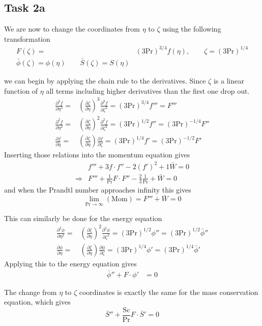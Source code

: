 \subsection*{Task 2a}
We are now to change the coordinates from $\eta$ to $\zeta$ using the following transformation
\begin{align*}
  F(\zeta) =& (3\text{Pr})^{3/4} f(\eta), \qquad \zeta = (3 \text{Pr})^{1/4} \\
  \bar{\phi}(\zeta) = \phi (\eta) \qquad \bar{S}(\zeta) = S(\eta )
\end{align*}

we can begin by applying the chain rule to the derivatives. Since $\zeta$ is a linear function of $\eta$ all terms including higher derivatives than the first one drop out.
\begin{align*}
  \frac{\partial^3 f}{\partial \eta^3}=& \left( \frac{\partial \zeta}{\partial \eta} \right)^3 \frac{\partial^3 f}{\partial \zeta^3}=(3 \text{Pr})^{3/4}f'''=F'''\\
  \frac{\partial^2 f}{\partial \eta^2}=& \left( \frac{\partial \zeta}{\partial \eta} \right)^2 \frac{\partial^2 f}{\partial \zeta^2}=(3 \text{Pr})^{1/2}f''=(3 \text{Pr})^{-1/4} F''\\
  \frac{\partial f}{\partial \eta}=& \left( \frac{\partial \zeta}{\partial \eta} \right) \frac{\partial f}{\partial \zeta}=(3 \text{Pr})^{1/4}f'=(3 \text{Pr})^{-1/2}F'
\end{align*}
Inserting those relations into the momentum equation gives
\begin{align*}
  &f'''+3f\cdot f'' -2(f')^2 + 1 \bar{W} = 0 \\
  \Rightarrow& F''' +\frac{1}{\text{Pr}}F\cdot F'' -\frac{2}{3}\frac{1}{\text{Pr}}+\bar{W}=0 
\end{align*}
and when the Prandtl number approaches infinity this gives
\begin{equation*}
  \lim_{\text{Pr}\rightarrow \infty} (\text{Mom}) = F'''+\bar{W} =0
\end{equation*}

This can similarly be done for the energy equation
\begin{align*}
  \frac{\partial^2 \phi}{\partial \eta^2}=& \left( \frac{\partial \zeta}{\partial \eta} \right)^2 \frac{\partial^2 \phi}{\partial \zeta^2}=(3 \text{Pr})^{1/2}\phi'' =(3 \text{Pr})^{1/2}\bar{\phi}'' \\
  \frac{\partial \phi}{\partial \eta}=& \left( \frac{\partial \zeta}{\partial \eta} \right) \frac{\partial \phi}{\partial \zeta}=(3 \text{Pr})^{1/4}\phi' =(3 \text{Pr})^{1/4}\bar{\phi}' 
\end{align*}
Applying this to the energy equation gives
\begin{align*}
  \bar{\phi}''+F\cdot\phi'&=0
\end{align*}

The change from $\eta$ to $\zeta$ coordinates is exactly the same for the mass conservation equation, which gives
\begin{equation*}
  \bar{S}''+\frac{\text{Sc}}{\text{Pr}}F\cdot \bar{S}'=0
\end{equation*}



